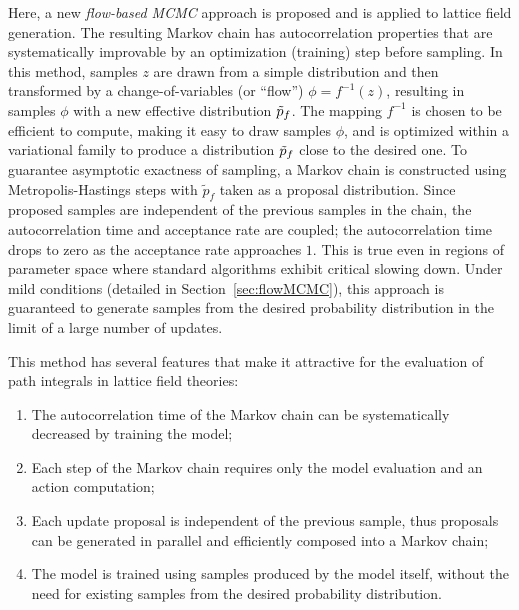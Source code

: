 Here, a new \emph{flow-based MCMC} approach is proposed and is applied to lattice field generation. The resulting Markov chain has autocorrelation properties that are systematically improvable by an optimization (training) step before sampling.
In this method, samples $z$ are drawn from a simple distribution and then transformed by a change-of-variables (or ``flow'') $\phi = f^{-1}(z)$, resulting in samples $\phi$ with a new effective distribution $\tilde{p}_f$. The mapping $f^{-1}$ is chosen to be efficient to compute, making it easy to draw samples $\phi$, and is optimized within a variational family to produce a distribution $\tilde{p}_f$ close to the desired one.
To guarantee asymptotic exactness of sampling, a Markov chain is constructed using Metropolis-Hastings steps with $\tilde{p}_{f}$ taken as a proposal distribution. Since proposed samples are independent of the previous samples in the chain, the autocorrelation time and acceptance rate are coupled; the autocorrelation time drops to zero as the acceptance rate approaches $1$. This is true even in regions of parameter space where standard algorithms exhibit critical slowing down. Under mild conditions (detailed in Section~\ref{sec:flowMCMC}), this approach is guaranteed to generate samples from the desired probability distribution in the limit of a large number of updates.

This method has several features that make it attractive for the evaluation of path integrals in lattice field theories:
%
\begin{enumerate}
    \item The autocorrelation time of the Markov chain can be systematically decreased by training the model;
    \item
    Each step of the Markov chain requires only the model evaluation and an action computation;
    \item Each update proposal is independent of the previous sample, thus proposals can be generated in parallel and efficiently composed into a Markov chain;
    \item The model is trained using samples produced by the model itself, without the need for existing samples from the desired probability distribution.
\end{enumerate}

